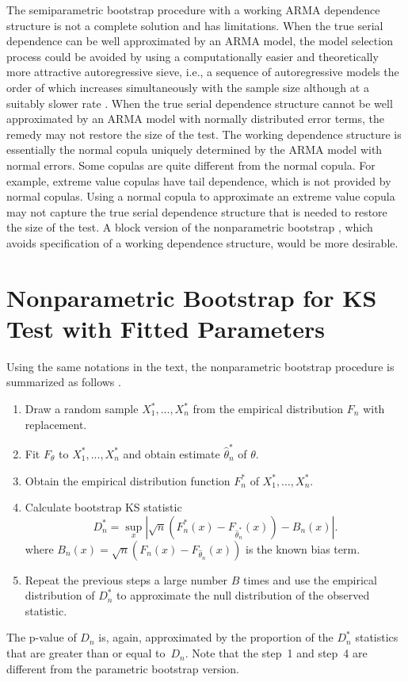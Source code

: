 \documentclass[12pt, letterpaper]{article}
\begin{document}
The semiparametric bootstrap procedure with a working ARMA dependence structure
is not a complete solution and has limitations. When the true serial dependence
can be well approximated by an ARMA model, the model selection process could be
avoided by using a computationally easier and theoretically more attractive
autoregressive sieve, i.e., a sequence of autoregressive models the order of 
which increases
simultaneously with the sample size although at a suitably slower rate 
\citep[e.g.,][]{psaradakis2017distance, psaradakis2020normality}.
When the true serial dependence
structure cannot be well approximated by an ARMA model with normally distributed
error terms, the remedy may not restore the size of the test. The working
dependence structure is essentially the normal copula uniquely determined by the
ARMA model with normal errors. Some copulas are quite different from the normal
copula. For example, extreme value copulas have tail dependence, which is not
provided by normal copulas.
Using a normal copula to approximate an extreme value copula may not capture the
true serial dependence structure that is needed to restore the size of the
test. A block version of the nonparametric bootstrap \citep{babu2004goodness},
which avoids specification of a working dependence structure, would be more
desirable.


\appendix

\section{Nonparametric Bootstrap for KS Test with Fitted Parameters}

Using the same notations in the text, the nonparametric bootstrap procedure 
is summarized as follows \citep{babu2004goodness}.
\begin{enumerate}
\item
  Draw a random sample $X_1^*,...,X_n^*$ from the empirical distribution $F_n$
  with replacement.
\item
  Fit $F_\theta$ to $X_1^*,...,X_n^*$ and obtain estimate 
	$\hat\theta_n^*$ of $\theta$.
\item
  Obtain the empirical distribution function $F_n^*$ of
  $X_1^*, \ldots,  X_n^*$. 
\item
  Calculate bootstrap KS statistic
  \[
    D_n^* = \sup_x | \sqrt{n}\left(F_n^* (x)- F_{\hat\theta_n^*}(x)\right) - B_n(x) |.
  \]
  where $B_{n}(x) = \sqrt{n}(F_{n}(x) - F_{\hat\theta_n}(x))$ is the known
  bias term.
\item
  Repeat the previous steps a large number $B$ times and use the empirical
  distribution of $D_n^*$ to approximate the null distribution of the observed
  statistic. 
\end{enumerate}
The p-value of $D_n$ is, again, approximated by the proportion of the $D_n^*$
statistics that are greater than or equal to~$D_n$. Note that the step~1 and
step~4 are different from the parametric bootstrap version.



\end{document}
